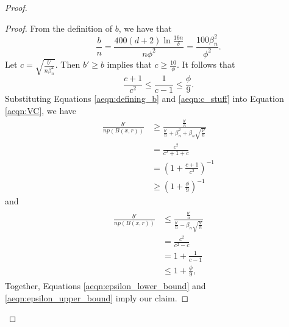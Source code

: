\begin{proof}
\begin{proof} From the definition of $b$, we have that \begin{equation}\label{aeqn:defining_b}\frac{b}{n} = \frac{400(d+2)\ln\frac{16n}{\delta}}{n\phi^2} = \frac{100\beta_n^2}{\phi^2}.\end{equation} Let $c = \sqrt{\frac{b'}{n\beta_n^2}}$. Then $b' \geq b$ implies that $c \geq \frac{10}{\phi}$. It follows that \begin{equation}\label{aeqn:c_stuff}\frac{c+1}{c^2} \leq \frac{1}{c-1} \leq \frac{\phi}{9}.\end{equation} Substituting Equations \ref{aeqn:defining_b} and \ref{aeqn:c_stuff} into  Equation \ref{aeqn:VC}, we have 
\begin{equation}\label{aeqn:epsilon_lower_bound}
\begin{split}
\frac{b'}{np(B(x, r))} &\geq \frac{\frac{b'}{n}}{\frac{b'}{n} + \beta_n^2 + \beta_n \sqrt{\frac{k'}{n}}} \\
&= \frac{c^2}{c^2 + 1 + c} \\
&= \left(1 + \frac{c+1}{c^2} \right)^{-1} \\
&\geq \left(1 + \frac{\phi}{9}\right)^{-1}
\end{split}
\end{equation}
and 
\begin{equation}\label{aeqn:epsilon_upper_bound}
\begin{split}
\begin{split}
\frac{b'}{np(B(x, r))} &\leq \frac{\frac{b'}{n}}{\frac{b'}{n} - \beta_n \sqrt{\frac{b'}{n}}} \\
&= \frac{c^2}{c^2 - c} \\
&= 1 + \frac{1}{c-1} \\
&\leq 1 + \frac{\phi}{9},
\end{split}
\end{split}
\end{equation}
Together, Equations \ref{aeqn:epsilon_lower_bound} and \ref{aeqn:epsilon_upper_bound} imply our claim.
\end{proof}


\end{proof}
